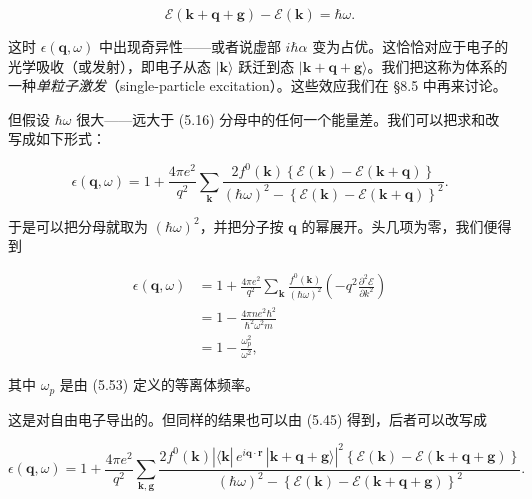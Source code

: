\begin{equation*}
\mathcal{E}(\mathbf{k}+\mathbf{q}+\mathbf{g}) - \mathcal{E}(\mathbf{k}) = \hbar\omega .
\tag{5.54}
\end{equation*}

这时 $\epsilon(\mathbf{q},\omega)$ 中出现奇异性——或者说虚部 $i\hbar\alpha$ 变为占优。这恰恰对应于电子的光学吸收（或发射），即电子从态 $|\mathbf{k}\rangle$ 跃迁到态 $|\mathbf{k}+\mathbf{q}+\mathbf{g}\rangle$。我们把这称为体系的一种\emph{单粒子激发}（single-particle excitation）。这些效应我们在 §8.5 中再来讨论。

但假设 $\hbar\omega$ 很大——远大于 (5.16) 分母中的任何一个能量差。我们可以把求和改写成如下形式：

\begin{equation*}
\epsilon(\mathbf{q},\omega) = 1 + \frac{4\pi e^2}{q^2} \sum_{\mathbf{k}} \frac{2f^0(\mathbf{k}) \left\{ \mathcal{E}(\mathbf{k}) - \mathcal{E}(\mathbf{k}+\mathbf{q}) \right\}}{(\hbar\omega)^2 - \left\{ \mathcal{E}(\mathbf{k}) - \mathcal{E}(\mathbf{k}+\mathbf{q}) \right\}^2} .
\tag{5.55}
\end{equation*}

于是可以把分母就取为 $(\hbar\omega)^2$，并把分子按 $\mathbf{q}$ 的幂展开。头几项为零，我们便得到

\begin{align*}
\epsilon(\mathbf{q},\omega) &= 1 + \frac{4\pi e^2}{q^2} \sum_{\mathbf{k}} \frac{f^0(\mathbf{k})}{(\hbar\omega)^2} \left( -q^2 \frac{\partial^2 \mathcal{E}}{\partial k^2} \right) \\
&= 1 - \frac{4\pi n e^2 \hbar^2}{\hbar^2 \omega^2 m} \\
&= 1 - \frac{\omega_p^2}{\omega^2} ,
\tag{5.56}
\end{align*}

其中 $\omega_p$ 是由 (5.53) 定义的等离体频率。

这是对自由电子导出的。但同样的结果也可以由 (5.45) 得到，后者可以改写成

\begin{equation*}
\epsilon(\mathbf{q},\omega) = 1 + \frac{4\pi e^2}{q^2} \sum_{\mathbf{k},\mathbf{g}} \frac{2f^0(\mathbf{k}) \left| \langle \mathbf{k}|\, e^{i\mathbf{q}\cdot\mathbf{r}}\, |\mathbf{k}+\mathbf{q}+\mathbf{g}\rangle \right|^2 \left\{ \mathcal{E}(\mathbf{k}) - \mathcal{E}(\mathbf{k}+\mathbf{q}+\mathbf{g}) \right\}}{(\hbar\omega)^2 - \left\{ \mathcal{E}(\mathbf{k}) - \mathcal{E}(\mathbf{k}+\mathbf{q}+\mathbf{g}) \right\}^2} .
\tag{5.57}
\end{equation*}

